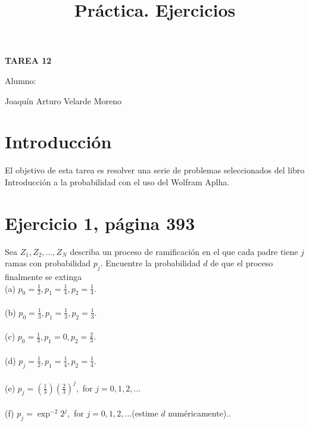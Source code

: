 \documentclass[]{article}
\title{Práctica. Ejercicios}
\date{}
\begin{document}
	\maketitle
	\begin{center}


\centerline{\textbf{TAREA 12} } 
\textbf{ }

\centerline{Alumno: } 
\centerline{Joaquín Arturo Velarde Moreno}


	\end{center}
	

\section{Introducción}

El objetivo de esta tarea es resolver una serie de problemas seleccionados del libro Introducción a la probabilidad\cite{Material} con el uso del Wolfram Aplha\cite{wolf}.

\section{Ejercicio 1, página 393}


Sea $Z_{1}, Z_{2}, ..., Z_{N}$ describa un proceso de ramificación en el que cada padre tiene  $j$ ramas con probabilidad $p_{j}$. Encuentre la probabilidad  $d$ de que el proceso finalmente se extinga
\\
(a) $p_{0} = \frac{1}{2}, p_{1} = \frac{1}{4}, p_{2} = \frac{1}{4}$.\\
\\
(b) $p_{0} = \frac{1}{3}, p_{1} = \frac{1}{3}, p_{2} = \frac{1}{3}$.\\
\\
(c) $p_{0} = \frac{1}{3}, p_{1} = 0, p_{2} = \frac{2}{3}$.\\
\\
(d) $p_{j} = \frac{1}{2}, p_{1} = \frac{1}{4}, p_{2} = \frac{1}{4}$.\\
\\
(e) $p_{j} = (\frac{1}{3})(\frac{2}{3})^{j},$ for $j = 0, 1, 2, ...$\\
\\
(f) $p_{j} = \exp^{-2}2^{j},$ for $j = 0, 1, 2, ...$(estime $d$ numéricamente)..\\
\\
\end{document}
